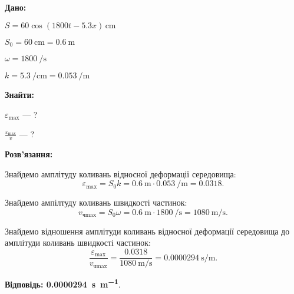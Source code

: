 \documentclass[a4paper,oneside,DIV=9,12pt]{scrartcl}
\newcommand\given{\noindent\textbf{Дано:}}
\newcommand\find{\noindent\textbf{Знайти:}}
\newcommand\solution{\noindent\textbf{Розв'язання:}}
\newcommand\answer[1]{\noindent\textbf{Відповідь: #1}}
\begin{document}
	
	\given\par
	$S = \num{60} \cos (1800t - \num{5,3}x)\, \si{\centi\metre}$
	
	
	$S_0 = \SI{60}{\centi\metre} = \SI{0,6}{\metre}$
	
	
	$\omega = \SI{1800}{\per\second}$
	
	
	$k = \SI{5,3}{\per\centi\metre} = \SI{0,053}{\per\metre}$
	
	\find\par
	$\varepsilon_{\text{max}}$ --- ?
	
	$\frac{\varepsilon_{\text{max}}}{v}$ --- ?
	
	\solution\par
	
	Знайдемо амплітуду коливань відносної деформації середовища:
	\[
		\varepsilon_{\text{max}} = S_{0}k = \SI{0,6}{\metre} \cdot \SI{0,053}{\per\metre} = \num{0,0318}.
	\]
	
	Знайдемо ампілтуду коливань швидкості частинок:
	\[
		v_{\text{чmax}} = S_0 \omega = \SI{0,6}{\metre} \cdot \SI{1800}{\per\second} = \SI{1080}{\metre\per\second}.
	\]
	
	Знайдемо відношення амплітуди коливань відносної деформації середовища до амплітуди коливань швидкості частинок:
	\[
		\frac{\varepsilon_{\text{max}}}{v_{\text{чmax}}} = \frac{\num{0,0318}}{\SI{1080}{\metre\per\second}} = \SI{0,0000294}{\second\per\metre}.
	\]
	
	\answer{\SI{0,0000294}{\second\per\metre}}.
	
\end{document}
